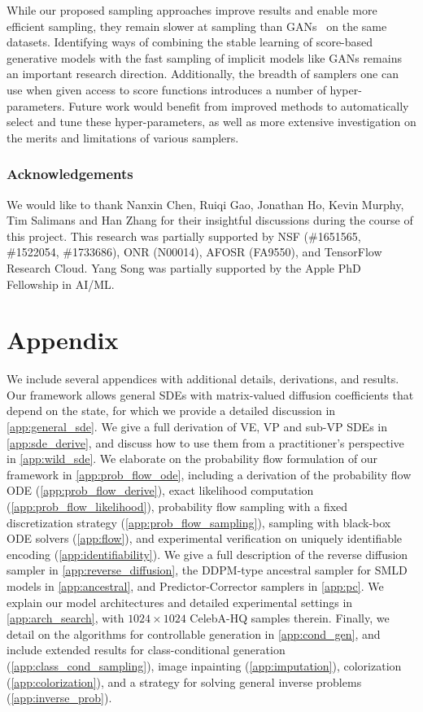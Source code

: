 \documentclass{article} \usepackage{iclr2021_conference,times}
\begin{document}
While our proposed sampling approaches improve results and enable more efficient sampling, they remain slower at sampling than GANs~\citep{goodfellow2014generative} on the same datasets. Identifying ways of combining the stable learning of score-based generative models with the fast sampling of implicit models like GANs remains an important research direction. Additionally, the breadth of samplers one can use when given access to score functions introduces a number of hyper-parameters. Future work would benefit from improved methods to automatically select and tune these hyper-parameters, as well as more extensive investigation on the merits and limitations of various samplers.

\subsubsection*{Acknowledgements}
We would like to thank Nanxin Chen, Ruiqi Gao, Jonathan Ho, Kevin Murphy, Tim Salimans and Han Zhang for their insightful discussions during the course of this project. This research was partially supported by NSF (\#1651565, \#1522054, \#1733686),
ONR (N00014), AFOSR (FA9550), and TensorFlow Research Cloud. Yang Song was partially supported by the Apple PhD Fellowship in AI/ML. 


\appendix
\newpage
\section*{Appendix}
We include several appendices with additional details, derivations, and results.
Our framework allows general SDEs with matrix-valued diffusion coefficients that depend on the state, for which we provide a detailed discussion in \cref{app:general_sde}. We give a full derivation of VE, VP and sub-VP SDEs in \cref{app:sde_derive}, and discuss how to use them from a practitioner's perspective in \cref{app:wild_sde}. We elaborate on the probability flow formulation of our framework in \cref{app:prob_flow_ode}, including a derivation of the probability flow ODE (\cref{app:prob_flow_derive}), exact likelihood computation (\cref{app:prob_flow_likelihood}), probability flow sampling with a fixed discretization strategy (\cref{app:prob_flow_sampling}), sampling with black-box ODE solvers (\cref{app:flow}), and experimental verification on uniquely identifiable encoding (\cref{app:identifiability}). We give a full description of the reverse diffusion sampler in \cref{app:reverse_diffusion}, the DDPM-type ancestral sampler for SMLD models in \cref{app:ancestral}, and Predictor-Corrector samplers in \cref{app:pc}. We explain our model architectures and detailed experimental settings in \cref{app:arch_search}, with $1024\times 1024$ CelebA-HQ samples therein. Finally, we detail on the algorithms for controllable generation in \cref{app:cond_gen}, and include extended results for class-conditional generation (\cref{app:class_cond_sampling}), image inpainting (\cref{app:imputation}), colorization (\cref{app:colorization}), and a strategy for solving general inverse problems (\cref{app:inverse_prob}).
\end{document}
